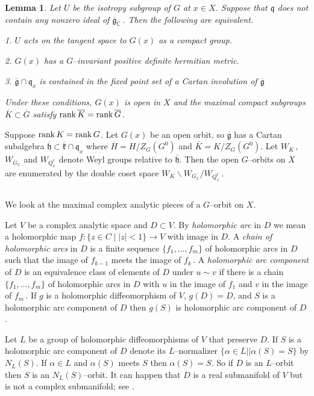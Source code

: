 \documentclass{conm-p-l}
\newtheorem{lemma}[equation]{Lemma}
\renewcommand{\gg}{\mathfrak{g}}
\newcommand{\gq}{\mathfrak{q}}
\def\gg{\mathfrak{g}}
\def\gh{\mathfrak{h}}
\def\gk{\mathfrak{k}}
\def\gq{\mathfrak{q}}
\def\rank{{\rm rank\,}}
\def\C{\mathbb{C}}
\begin{document}
\begin{lemma}\label{6.4.5}
Let $U$ be the isotropy subgroup of $G$ at $x \in X$.  Suppose that
$\gq$ does not contain any nonzero ideal of $\overline{\gg}_\C$\,.
Then the following are equivalent.

1. $U$ acts on the tangent space to $G(x)$ as a compact group.

2. $G(x)$ has a $G$--invariant positive definite hermitian metric.

3. $\overline{\gg}\cap \gq_x$ is contained in the fixed point set of a
Cartan involution of $\overline{\gg}$

\noindent
Under these conditions, $G(x)$ is open in $X$ and the maximal compact
subgroups $\overline{K} \subset \overline{G}$ satisfy
$\rank \overline{K} = \rank \overline{G}$.
\end{lemma}

Suppose $\rank K = \rank G$.  Let $G(x)$ be an open orbit, so 
$\overline{\gg}$ has a Cartan subalgebra $\overline{\gh} \subset
\overline{\gk}\cap\gq_x$ where $\overline{H} = H/Z_G(G^0)$ and
$\overline{K} = K/Z_G(G^0)$.  Let $W_K$\,, $W_{G_\C}$ and $W_{Q_x^r}$
denote Weyl groups relative to $\overline{\gh}$.  Then
\cite[Theorem 4.9]{W1969} the open $G$--orbits on $X$ are enumerated
by the double coset space $W_K\backslash W_{G_\C}/W_{Q_x^r}$\,.

\subsection{}\label{ssec6d}\setcounter{equation}{0}
We look at the maximal complex analytic pieces of a $G$--orbit on $X$.

Let $V$ be a complex analytic space and $D \subset V$.  By {\em holomorphic
arc} in $D$ we mean a holomorphic map $f:\{z \in C \mid |z|<1\} \to V$
with image in $D$.  A {\em chain of holomorphic arcs} in $D$ is a finite
sequence $\{f_1,\dots,f_m\}$ of holomorphic arcs in $D$ such that the
image of $f_{k-1}$ meets the image of $f_k$\,.  A {\em holomorphic arc
component} of $D$ is an equivalence class of elements of $D$ under
$u \sim v$ if there is a chain $\{f_1,\dots,f_m\}$ of holomorphic
arcs in $D$ with $u$ in the image of $f_1$ and $v$ in the image of $f_m$\,.
If $g$ is a holomorphic diffeomorphism of $V$, $g(D) = D$, and
$S$ is a holomorphic arc component of $D$ then $g(S)$ is 
holomorphic arc component of $D$.

Let $L$ be a group of holomorphic diffeomorphisms of $V$ that preserve $D$.
If $S$ is a holomorphic arc component of $D$ denote its $L$--normalizer
$\{\alpha \in L | \mid \alpha(S) = S\}$ by $N_L(S)$.  If $\alpha \in L$
and $\alpha(S)$ meets $S$ then $\alpha(S) = S$.  So if $D$ is an $L$--orbit
then $S$ is an $N_L(S)$--orbit.  It can happen that $D$ is a
real submanifold of $V$ but is not a complex submanifold; see 
\cite[Example 8.12]{W1969}.  
\end{document}
